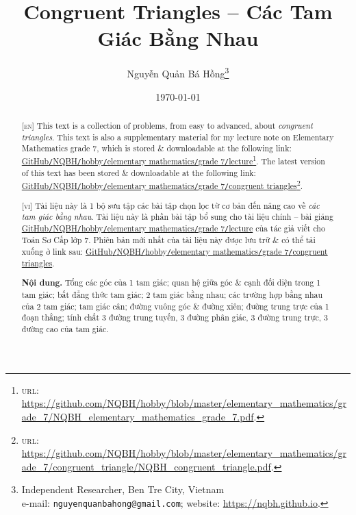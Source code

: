 \documentclass{article}
\title{Congruent Triangles -- Các Tam Giác Bằng Nhau}
\author{Nguyễn Quản Bá Hồng\footnote{Independent Researcher, Ben Tre City, Vietnam\\e-mail: \texttt{nguyenquanbahong@gmail.com}; website: \url{https://nqbh.github.io}.}}
\date{\today}
\begin{document}
\maketitle
\begin{abstract}
	\textsc{[en]} This text is a collection of problems, from easy to advanced, about \textit{congruent triangles}. This text is also a supplementary material for my lecture note on Elementary Mathematics grade 7, which is stored \& downloadable at the following link: \href{https://github.com/NQBH/hobby/blob/master/elementary_mathematics/grade_7/NQBH_elementary_mathematics_grade_7.pdf}{GitHub\texttt{/}NQBH\texttt{/}hobby\texttt{/}elementary mathematics\texttt{/}grade 7\texttt{/}lecture}\footnote{\textsc{url}: \url{https://github.com/NQBH/hobby/blob/master/elementary_mathematics/grade_7/NQBH_elementary_mathematics_grade_7.pdf}.}. The latest version of this text has been stored \& downloadable at the following link: \href{https://github.com/NQBH/hobby/blob/master/elementary_mathematics/grade_7/congruent_triangle/NQBH_congruent_triangle.pdf}{GitHub\texttt{/}NQBH\texttt{/}hobby\texttt{/}elementary mathematics\texttt{/}grade 7\texttt{/}congruent triangles}\footnote{\textsc{url}: \url{https://github.com/NQBH/hobby/blob/master/elementary_mathematics/grade_7/congruent_triangle/NQBH_congruent_triangle.pdf}.}.
	\vspace{2mm}
	
	\textsc{[vi]} Tài liệu này là 1 bộ sưu tập các bài tập chọn lọc từ cơ bản đến nâng cao về \textit{các tam giác bằng nhau}. Tài liệu này là phần bài tập bổ sung cho tài liệu chính -- bài giảng \href{https://github.com/NQBH/hobby/blob/master/elementary_mathematics/grade_7/NQBH_elementary_mathematics_grade_7.pdf}{GitHub\texttt{/}NQBH\texttt{/}hobby\texttt{/}elementary mathematics\texttt{/}grade 7\texttt{/}lecture} của tác giả viết cho Toán Sơ Cấp lớp 7. Phiên bản mới nhất của tài liệu này được lưu trữ \& có thể tải xuống ở link sau: \href{https://github.com/NQBH/hobby/blob/master/elementary_mathematics/grade_7/congruent_triangle/NQBH_congruent_triangle.pdf}{GitHub\texttt{/}NQBH\texttt{/}hobby\texttt{/}elementary mathematics\texttt{/}grade 7\texttt{/}congruent triangles}.
	
	\textsf{\textbf{Nội dung.} Tổng các góc của 1 tam giác; quan hệ giữa góc \& cạnh đối diện trong 1 tam giác; bất đẳng thức tam giác; 2 tam giác bằng nhau; các trường hợp bằng nhau của 2 tam giác; tam giác cân; đường vuông góc \& đường xiên; đường trung trực của 1 đoạn thẳng; tính chất 3 đường trung tuyến, 3 đường phân giác, 3 đường trung trực, 3 đường cao của tam giác.}
\end{abstract}
\setcounter{secnumdepth}{4}
\setcounter{tocdepth}{3}
\tableofcontents
\newpage
\end{document}
